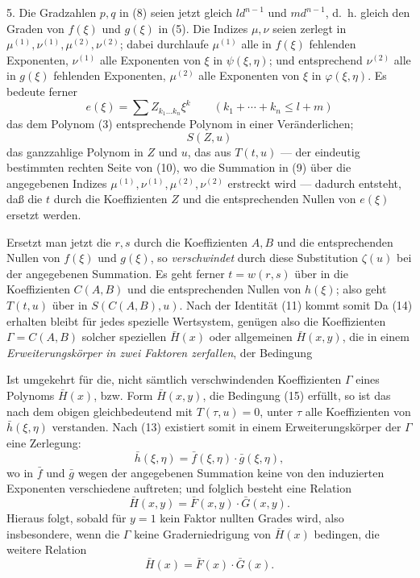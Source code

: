 5. Die Gradzahlen $p,q$ in (8) seien jetzt gleich $ld^{n-1}$ und $md^{n-1}$, d.~h. gleich den Graden von $f(\xi)$ und $g(\xi)$ in (5). Die Indizes $\mu,\nu$ seien zerlegt in $\mu^{(1)},\nu^{(1)},\mu^{(2)},\nu^{(2)}$; dabei durchlaufe $\mu^{(1)}$ alle in $f(\xi)$ fehlenden Exponenten, $\nu^{(1)}$ alle Exponenten von $\xi$ in $\psi(\xi,\eta)$; und entsprechend $\nu^{(2)}$ alle in $g(\xi)$ fehlenden Exponenten, $\mu^{(2)}$ alle Exponenten von $\xi$ in $\varphi(\xi,\eta)$. Es bedeute ferner
\[
 e(\xi)=\sum Z_{k_1\ldots k_n}\xi^k\qquad(k_1+\cdots+k_n\le l+m)
\]
das dem Polynom (3) entsprechende Polynom in einer Veränderlichen;
\[
 S(Z,u)
\]
das ganzzahlige Polynom in $Z$ und $u$, das aus $T(t,u)$ --- der eindeutig bestimmten rechten Seite von (10), wo die Summation in (9) über die angegebenen Indizes $\mu^{(1)},\nu^{(1)},\mu^{(2)},\nu^{(2)}$ erstreckt wird --- dadurch entsteht, daß die $t$ durch die Koeffizienten $Z$ und die entsprechenden Nullen von $e(\xi)$ ersetzt werden.

Ersetzt man jetzt die $r,s$ durch die Koeffizienten $A,B$ und die entsprechenden Nullen von $f(\xi)$ und $g(\xi)$, so \emph{verschwindet} durch diese Substitution $\zeta(u)$ bei der angegebenen Summation. Es geht ferner $t=w(r,s)$ über in die Koeffizienten $C(A,B)$ und die entsprechenden Nullen von $h(\xi)$; also geht $T(t,u)$ über in $S(C(A,B),u)$. Nach der Identität (11) kommt somit
Da (14) erhalten bleibt für jedes spezielle Wertsystem, genügen also die Koeffizienten $\Gamma=C(A,B)$ solcher speziellen $\bar H(x)$ oder allgemeinen $\bar H(x,y)$, die in einem \emph{Erweiterungskörper in zwei Faktoren zerfallen}, der Bedingung

Ist umgekehrt für die, nicht sämtlich verschwindenden Koeffizienten $\Gamma$ eines Polynoms $\bar H(x)$, bzw. Form $\bar H(x,y)$, die Bedingung (15) erfüllt, so ist das nach dem obigen gleichbedeutend mit $T(\tau,u)=0$, unter $\tau$ alle Koeffizienten von $\bar h(\xi,\eta)$ verstanden. Nach (13) existiert somit in einem Erweiterungskörper der $\Gamma$ eine Zerlegung:
\[
 \bar h(\xi,\eta)=\bar f(\xi,\eta)\cdot\bar g(\xi,\eta),
\]
wo in $\bar f$ und $\bar g$ wegen der angegebenen Summation keine von den induzierten Exponenten verschiedene auftreten; und folglich besteht eine Relation
\[
 \bar H(x,y)=\bar F(x,y)\cdot\bar G(x,y).
\]
Hieraus folgt, sobald für $y=1$ kein Faktor nullten Grades wird, also insbesondere, wenn die $\Gamma$ keine Graderniedrigung von $\bar H(x)$ bedingen, die weitere Relation
\[
 \bar H(x)=\bar F(x)\cdot\bar G(x).
\]

